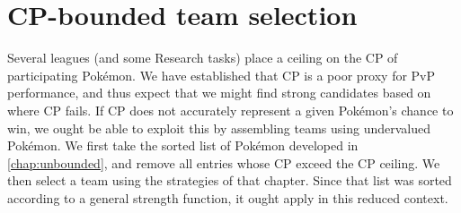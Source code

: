 \chapter{CP-bounded team selection}
\label{chap:bounded}
Several leagues (and some Research tasks) place a ceiling on the CP of
 participating Pokémon.
We have established that CP is a poor proxy for PvP performance, and thus
 expect that we might find strong candidates based on where CP fails.
If CP does not accurately represent a given Pokémon's chance to win, we ought
 be able to exploit this by assembling teams using undervalued Pokémon.
We first take the sorted list of Pokémon developed in \autoref{chap:unbounded},
 and remove all entries whose CP exceed the CP ceiling.
We then select a team using the strategies of that chapter. Since
 that list was sorted according to a general strength function, it
 ought apply in this reduced context.

